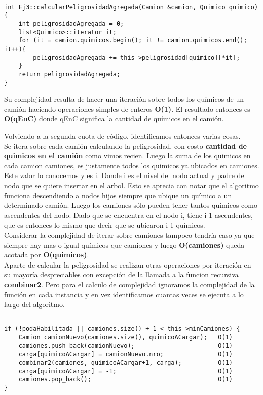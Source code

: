 \begin{lstlisting}

int Ej3::calcularPeligrosidadAgregada(Camion &camion, Quimico quimico){
	int peligrosidadAgregada = 0;
	list<Quimico>::iterator it;
	for (it = camion.quimicos.begin(); it != camion.quimicos.end(); it++){
		peligrosidadAgregada += this->peligrosidad[quimico][*it];
	}
	return peligrosidadAgregada;
}

\end{lstlisting}

\noindent 
Su complejidad resulta de hacer una iteraci\'on sobre todos los qu\'imicos de un cami\'on haciendo operaciones simples de enteros \textbf{O(1)}. El resultado entonces es \textbf{O(qEnC)} donde qEnC significa la cantidad de qu\'imicos en el cami\'on. 

\noindent 
Volviendo a la segunda cuota de c\'odigo, identificamos entonces varias cosas. \\
Se itera sobre cada cami\'on calculando la peligrosidad, con costo \textbf{cantidad de quimicos en el cami\'on} como vimos recien.
Luego la suma de los quimicos en cada camion camiones, es justamente todos los quimicos ya ubicados en camiones. Este valor lo conocemos y es i. Donde i es el nivel del nodo actual y padre del nodo que se quiere insertar en el arbol. Esto se aprecia con notar que el algoritmo funciona descendiendo a nodos hijos siempre que ubique un qu\'imico a un determinado cami\'on. Luego los camiones s\'olo pueden tener tantos qu\'imicos como ascendentes del nodo. Dado que se encuentra en el nodo i, tiene i-1 ascendentes, que es entonces lo mismo que decir que se ubicaron i-1 qu\'imicos.  \\
Considerar la complejidad de iterar sobre camiones tampoco tendr\'ia caso ya que siempre hay mas o igual qu\'imicos que camiones y luego \textbf{O(camiones)} queda acotada por \textbf{O(quimicos)}.\\
Aparte de calcular la peligrosidad se realizan otras operaciones por iteraci\'on en su mayor\'ia despreciables con excepci\'on de la llamada a la funcion recursiva \textbf{combinar2}. Pero para el calculo de complejidad ignoramos la complejidad de la funci\'on en cada instancia y en vez identificamos cuantas veces se ejecuta a lo largo del algoritmo.

\begin{lstlisting}

if (!podaHabilitada || camiones.size() + 1 < this->minCamiones) {
	Camion camionNuevo(camiones.size(), quimicoACargar);   O(1)
	camiones.push_back(camionNuevo);                       O(1)
	carga[quimicoACargar] = camionNuevo.nro;               O(1)
	combinar2(camiones, quimicoACargar+1, carga);          O(1) 
	carga[quimicoACargar] = -1;                            O(1)
	camiones.pop_back();                                   O(1)
}
\end{lstlisting}


